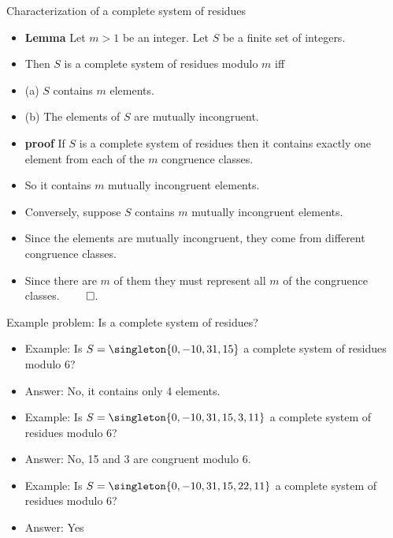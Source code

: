 \documentclass{beamer}
\begin{document}
\begin{frame}{Characterization of a complete system of residues}

\begin{itemize}
  \item  \textbf{Lemma} Let $m>1$ be an integer. Let $S$ be a finite set of integers.
  \item Then $S$ is a complete system of residues modulo $m$ iff
  \item (a) $S$ contains $m$ elements.
  \item (b) The elements of $S$ are mutually incongruent.
  \item \textbf{proof} If $S$ is a complete system of residues then it contains exactly
  one element from each of the $m$ congruence classes.
  \item So it contains $m$ mutually incongruent elements.
  \item Conversely, suppose $S$ contains $m$ mutually incongruent elements.
  \item Since the elements are mutually incongruent, they come from different congruence classes.
  \item Since there are $m$ of them they must represent all $m$ of the congruence classes. $\qed$.
\end{itemize}

\end{frame}


\begin{frame}{Example problem: Is a complete system of residues?}

\begin{itemize}
  \item  Example: Is $S=\singleton{0, -10, 31, 15}$ a complete system of residues modulo 6?
  \item Answer: No, it contains only 4 elements.
  \item  Example: Is $S=\singleton{0,-10,31,  15, 3, 11}$ a complete system of residues modulo 6?
  \item Answer: No, 15 and 3 are congruent modulo 6.
  \item Example: Is $S=\singleton{0, -10,31, 15, 22, 11}$ a complete system of residues modulo 6?
  \item Answer: Yes
\end{itemize}

\end{frame}
\end{document}
